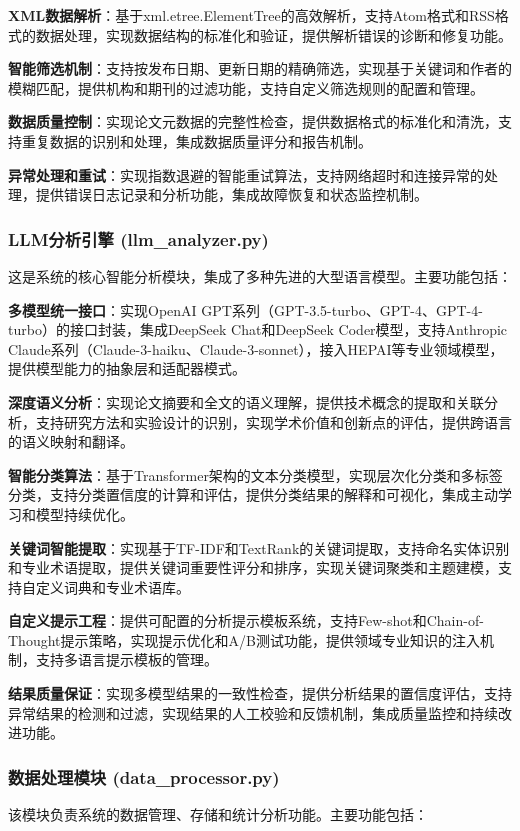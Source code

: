 \documentclass[12pt,a4paper]{article}
\begin{document}
\textbf{XML数据解析}：基于xml.etree.ElementTree的高效解析，支持Atom格式和RSS格式的数据处理，实现数据结构的标准化和验证，提供解析错误的诊断和修复功能。

\textbf{智能筛选机制}：支持按发布日期、更新日期的精确筛选，实现基于关键词和作者的模糊匹配，提供机构和期刊的过滤功能，支持自定义筛选规则的配置和管理。

\textbf{数据质量控制}：实现论文元数据的完整性检查，提供数据格式的标准化和清洗，支持重复数据的识别和处理，集成数据质量评分和报告机制。

\textbf{异常处理和重试}：实现指数退避的智能重试算法，支持网络超时和连接异常的处理，提供错误日志记录和分析功能，集成故障恢复和状态监控机制。

\subsubsection{LLM分析引擎 (llm\_analyzer.py)}
这是系统的核心智能分析模块，集成了多种先进的大型语言模型。主要功能包括：

\textbf{多模型统一接口}：实现OpenAI GPT系列（GPT-3.5-turbo、GPT-4、GPT-4-turbo）的接口封装，集成DeepSeek Chat和DeepSeek Coder模型，支持Anthropic Claude系列（Claude-3-haiku、Claude-3-sonnet），接入HEPAI等专业领域模型，提供模型能力的抽象层和适配器模式。

\textbf{深度语义分析}：实现论文摘要和全文的语义理解，提供技术概念的提取和关联分析，支持研究方法和实验设计的识别，实现学术价值和创新点的评估，提供跨语言的语义映射和翻译。

\textbf{智能分类算法}：基于Transformer架构的文本分类模型，实现层次化分类和多标签分类，支持分类置信度的计算和评估，提供分类结果的解释和可视化，集成主动学习和模型持续优化。

\textbf{关键词智能提取}：实现基于TF-IDF和TextRank的关键词提取，支持命名实体识别和专业术语提取，提供关键词重要性评分和排序，实现关键词聚类和主题建模，支持自定义词典和专业术语库。

\textbf{自定义提示工程}：提供可配置的分析提示模板系统，支持Few-shot和Chain-of-Thought提示策略，实现提示优化和A/B测试功能，提供领域专业知识的注入机制，支持多语言提示模板的管理。

\textbf{结果质量保证}：实现多模型结果的一致性检查，提供分析结果的置信度评估，支持异常结果的检测和过滤，实现结果的人工校验和反馈机制，集成质量监控和持续改进功能。

\subsubsection{数据处理模块 (data\_processor.py)}
该模块负责系统的数据管理、存储和统计分析功能。主要功能包括：
\end{document}
